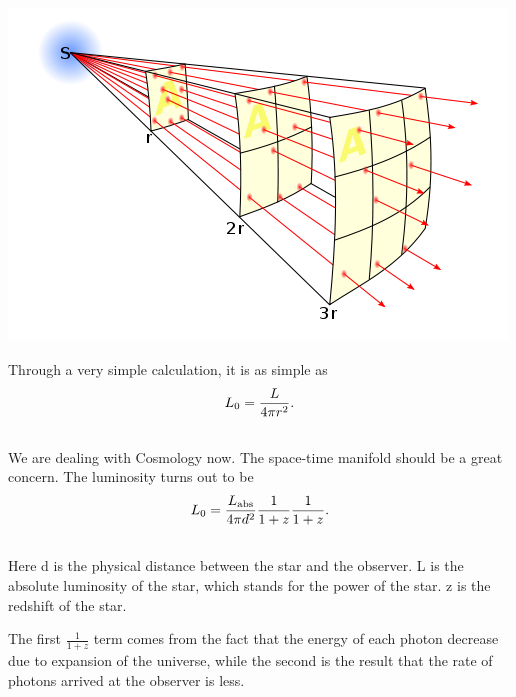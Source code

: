 \documentclass[letterpaper,10pt,english]{sphinxmanual}
\begin{document}
{{\hfill\includegraphics{InverseSquareLaw.png}\hfill}

Through a very simple calculation, it is as simple as
\begin{gather}
\begin{split}L_0 = \frac{ L }{ 4\pi r^2 } .\end{split}\notag\\\begin{split}\end{split}\notag
\end{gather}
We are dealing with Cosmology now. The space-time manifold should be a great concern. The luminosity turns out to be
\begin{gather}
\begin{split}L_0 = \frac{L_\mathrm{abs} }{4\pi d^2} \frac{1}{1+z} \frac{1}{1+z} .\end{split}\notag\\\begin{split}\end{split}\notag
\end{gather}
Here d is the physical distance between the star and the observer. L is the absolute luminosity of the star, which stands for the power of the star. z is the redshift of the star.

The first $\frac{1}{1+z}$ term comes from the fact that the energy of each photon decrease due to expansion of the universe, while the second is the result that the rate of photons arrived at the observer is less.

}
\end{document}
